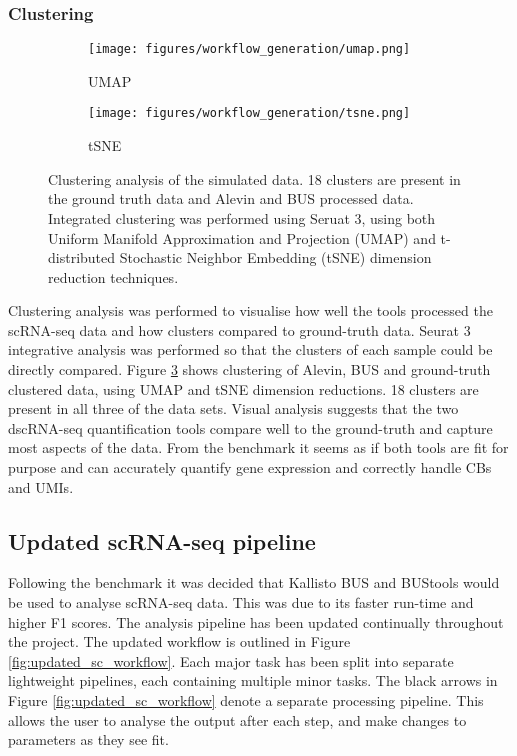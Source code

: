 \subsubsection{Clustering}

\begin{figure}[ht]
\centering
\begin{subfigure}{0.7\textwidth}
    \texttt{[image: figures/workflow\_generation/umap.png]}
    \caption{UMAP}
    \label{fig:benchmark_UMAP}
\end{subfigure}
\medskip
\begin{subfigure}{0.7\textwidth}
    \texttt{[image: figures/workflow\_generation/tsne.png]}
    \caption{tSNE}
    \label{fig:benchmark_tsne}
\end{subfigure}
\caption[Clustering analysis benchmark]{Clustering analysis of the simulated data.
18 clusters are present in the ground truth data and Alevin and BUS processed data.
Integrated clustering was performed using Seruat 3\cite{stuart2019comprehensive}, using both Uniform Manifold Approximation and Projection (UMAP) and  t-distributed Stochastic Neighbor Embedding (tSNE) dimension reduction techniques.}
\label{fig:benchmark_clustering}
\end{figure}

Clustering analysis was performed to visualise how well the tools processed the scRNA-seq data and how clusters compared to ground-truth data.
Seurat 3 integrative analysis was performed so that the clusters of each sample could be directly compared.
Figure \ref{fig:benchmark_clustering} shows clustering of Alevin, BUS and ground-truth clustered data, using UMAP and tSNE dimension reductions.
18 clusters are present in all three of the data sets.
Visual analysis suggests that the two dscRNA-seq quantification tools compare well to the ground-truth and capture most aspects of the data.
From the benchmark it seems as if both tools are fit for purpose and can accurately quantify gene expression and correctly handle CBs and UMIs.

\afterpage{\clearpage}


\subsection{Updated scRNA-seq pipeline}\label{subsec:updated_scrna}
Following the benchmark it was decided that Kallisto BUS and BUStools would be used to analyse scRNA-seq data.
This was due to its faster run-time and higher F1 scores.
The analysis pipeline has been updated continually throughout the project.
The updated workflow is outlined in Figure \ref{fig:updated_sc_workflow}.
Each major task has been split into separate lightweight pipelines, each containing multiple minor tasks.
The black arrows in Figure \ref{fig:updated_sc_workflow} denote a separate processing pipeline.
This allows the user to analyse the output after each step, and make changes to parameters as they see fit.

